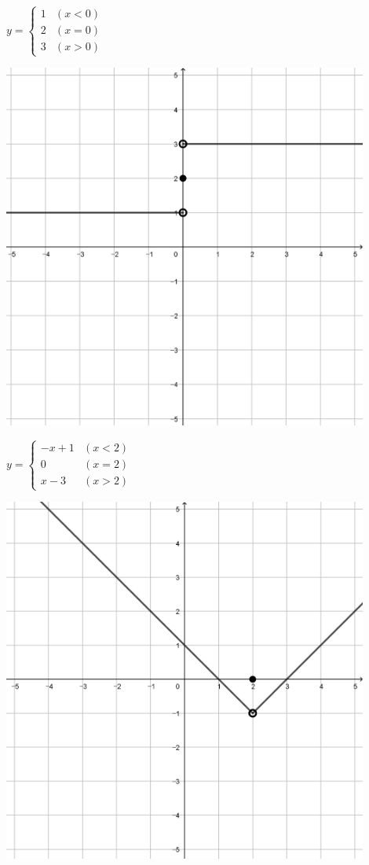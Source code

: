 \documentclass[a4paper]{oblivoir}
\begin{document}
\clearpage
\begin{minipage}{0.45\textwidth}\centering
\(y=\begin{cases}1&(x<0)\\2&(x=0)\\3&(x>0)\end{cases}\)
\par\bigskip\includegraphics[width=0.9\textwidth]{img/14-1}
\end{minipage}
\begin{minipage}{0.45\textwidth}\centering
\(y=\begin{cases}-x+1&(x<2)\\0&(x=2)\\x-3&(x>2)\end{cases}\)
\par\bigskip\includegraphics[width=0.9\textwidth]{img/14-2}
\end{minipage}\bigskip\bigskip\par
\end{document}
